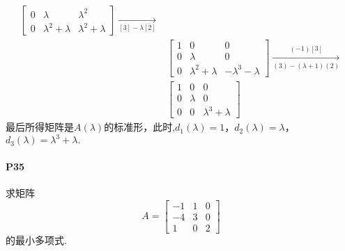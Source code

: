 \documentclass[12pt, a4paper, oneside, fontset=none]{ctexart}
\begin{document}
\begin{align*}
\begin{bmatrix}
                     0 & \lambda             & \lambda^2           \\
                     0 & \lambda^2 + \lambda & \lambda^2 + \lambda
                 \end{bmatrix} \xrightarrow[{[3]-\lambda[2]}]{}                                  \\
               & \begin{bmatrix}
                     1 & 0                   & 0                    \\
                     0 & \lambda             & 0                    \\
                     0 & \lambda^2 + \lambda & -\lambda^3 - \lambda
                 \end{bmatrix} \xrightarrow[{(3)-(\lambda+1)(2)}]{(-1)[3]}                       \\
               & \begin{bmatrix}
                     1 & 0       & 0                   \\
                     0 & \lambda & 0                   \\
                     0 & 0       & \lambda^3 + \lambda
                 \end{bmatrix}
\end{align*}
最后所得矩阵是$A(\lambda)$的标准形，此时,$d_1(\lambda) = 1$，$d_2(\lambda)=\lambda$，$d_3(\lambda) = \lambda^3 + \lambda.$

\paragraph*{P35} 求矩阵
\begin{equation*}
    A = \begin{bmatrix}
        -1 & 1 & 0 \\
        -4 & 3 & 0 \\
        1  & 0 & 2
    \end{bmatrix}
\end{equation*}
的最小多项式.
\end{document}
